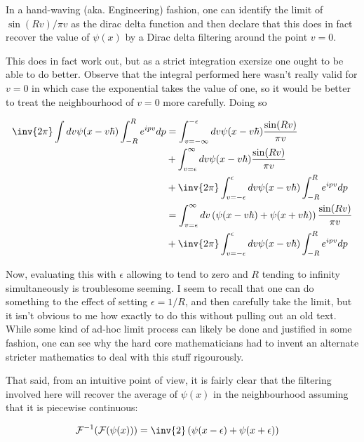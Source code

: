 \documentclass{article}
\newcommand{\FF}[0]{\mathcal{F}}
\begin{document}
In a hand-waving (aka. Engineering) fashion, one can identify the limit of $\sin(Rv)/\pi v$ as the dirac delta function and
then declare that this does in fact recover the value of $\psi(x)$ by a Dirac delta filtering around the point $v=0$.

This does in fact work out, but as a strict integration exersize one ought to be able to do better.
Observe that the integral performed here wasn't really valid for $v=0$ in which case the exponential takes the value of one, so it would be
better to treat the neighbourhood of $v=0$ more carefully.  Doing so

\begin{align*}
\inv{{2\pi}} \int dv \psi(x -v\hbar) \int_{-R}^R e^{i p v} dp 
&= \int_{v=-\infty}^{-\epsilon} dv \psi(x - v\hbar) \frac{\sin(R v)}{\pi v} \\
&+ \int_{v=\epsilon}^\infty dv \psi(x - v\hbar) \frac{\sin(R v)}{\pi v} \\
&+ \inv{{2\pi}} \int_{v=-\epsilon}^\epsilon dv \psi(x - v\hbar) \int_{-R}^R e^{i p v} dp \\
&= \int_{v=\epsilon}^\infty dv \left( \psi(x - v\hbar) +\psi(x + v\hbar) \right) \frac{\sin(R v)}{\pi v} \\
&+ \inv{{2\pi}} \int_{v=-\epsilon}^\epsilon dv \psi(x - v\hbar) \int_{-R}^R e^{i p v} dp \\
\end{align*}

Now, evaluating this with $\epsilon$ allowing to tend to zero and $R$ tending to infinity simultaneously is troublesome seeming.  I seem to recall that one
can do something to the effect of setting $\epsilon=1/R$, and then carefully take the limit, but it isn't obvious to me how exactly to do this without
pulling out an old text.
While some kind of ad-hoc limit process can likely be done and justified in some fashion, one can see why the hard core mathematicians had to invent
an alternate stricter mathematics to deal with this stuff rigourously.

That said, from an intuitive point of view, it is fairly clear that the filtering involved here will recover the average of
$\psi(x)$ in the neighbourhood assuming that it is piecewise continuous:

\begin{align*}
\FF^{-1}(\FF(\psi(x))) &= \inv{2} \left( \psi(x -\epsilon) + \psi(x + \epsilon) \right)
\end{align*}



\end{document}
